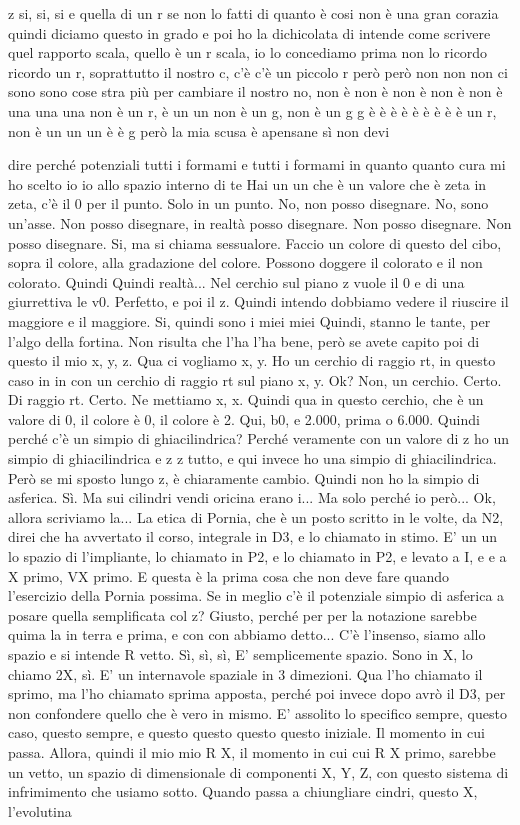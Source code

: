\begin{soluzione}
z si, si, si e quella di un r se non lo fatti di quanto è cosi non è una gran corazia quindi diciamo questo in grado e poi ho la dichicolata di intende come scrivere quel rapporto scala, quello è un r scala, io lo concediamo prima non lo ricordo ricordo un r, soprattutto il nostro c, c'è c'è un piccolo r però però non non non ci sono sono cose stra più per cambiare il nostro no, non è non è non è non è non è una una una non è un r, è un un non è un g, non è un g g è è è è è è è è è un r, non è un un un è è g però la mia scusa è apensane sì non devi 
   
   dire perché potenziali tutti i formami e tutti i formami in quanto quanto cura mi ho scelto io io allo spazio interno di te Hai un un che è un valore che è zeta in zeta, c'è il 0 per il punto. Solo in un punto. No, non posso disegnare. No, sono un'asse. Non posso disegnare, in realtà posso disegnare. Non posso disegnare. Non posso disegnare. Si, ma si chiama sessualore. Faccio un colore di questo del cibo, sopra il colore, alla gradazione del colore. Possono doggere il colorato e il non colorato. Quindi Quindi realtà... Nel cerchio sul piano z vuole il 0 e di una giurrettiva le v0. Perfetto, e poi il z. Quindi intendo dobbiamo vedere il riuscire il maggiore e il maggiore. Si, quindi sono i miei miei Quindi, stanno le tante, per l'algo della fortina. Non risulta che l'ha l'ha bene, però se avete capito poi di questo il mio x, y, z. Qua ci vogliamo x, y. Ho un cerchio di raggio rt, in questo caso in in con un cerchio di raggio rt sul piano x, y. Ok? Non, un cerchio. Certo. Di raggio rt. Certo. Ne mettiamo x, x. Quindi qua in questo cerchio, che è un valore di 0, il colore è 0, il colore è 2. Qui, b0, e 2.000, prima o 6.000. Quindi perché c'è un simpio di ghiacilindrica? Perché veramente con un valore di z ho un simpio di ghiacilindrica e z z tutto, e qui invece ho una simpio di ghiacilindrica. Però se mi sposto lungo z, è chiaramente cambio. Quindi non ho la simpio di asferica. Sì. Ma sui cilindri vendi oricina erano i... Ma solo perché io però... Ok, allora scriviamo la... La etica di Pornia, che è un posto scritto in le volte, da N2, direi che ha avvertato il corso, integrale in D3, e lo chiamato in stimo. E' un un lo spazio di l'impliante, lo chiamato in P2, e lo chiamato in P2, e levato a I, e e a X primo, VX primo. E questa è la prima cosa che non deve fare quando l'esercizio della Pornia possima. Se in meglio c'è il potenziale simpio di asferica a posare quella semplificata col z? Giusto, perché per per la notazione sarebbe quima la in terra e prima, e con con abbiamo detto... C'è l'insenso, siamo allo spazio e si intende R vetto. Sì, sì, sì, E' semplicemente spazio. Sono in X, lo chiamo 2X, sì. E' un internavole spaziale in 3 dimezioni. Qua l'ho chiamato il sprimo, ma l'ho chiamato sprima apposta, perché poi invece dopo avrò il D3, per non confondere quello che è vero in mismo. E' assolito lo specifico sempre, questo caso, questo sempre, e questo questo questo questo iniziale. Il momento in cui passa. Allora, quindi il mio mio R X, il momento in cui cui R X primo, sarebbe un vetto, un spazio di dimensionale di componenti X, Y, Z, con questo sistema di infrimimento che usiamo sotto. Quando passa a chiungliare cindri, questo X, l'evolutina 
\end{soluzione}
